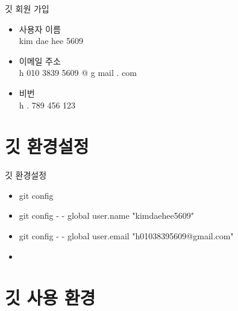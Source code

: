 \documentclass[aspectratio=1610,20pt,xcolor=pdftex,dvipsnames,table,handout]{beamer}
\begin{document}
		\begin{frame} [t,plain]

			\begin{block} {깃  회원 가입}
			\setlength{\leftmargini}{2em}			
			\begin{itemize}
				\item 사용자 이름 \\ kim dae hee 5609
				\item 이메일 주소 \\ h 010 3839 5609 @ g mail . com
				\item 비번 \\  h . 789 456 123
			\end{itemize}
			\end{block}						

		\end{frame}			


		\section{깃 환경설정}


		\begin{frame} [t,plain]

			\begin{block} {깃 환경설정}
			\setlength{\leftmargini}{2em}			
			\begin{itemize}
				\item git config
				\item git config - - global user.name "kimdaehee5609"
				\item git config - - global user.email "h01038395609@gmail.com"
				\item 
			\end{itemize}
			\end{block}						


		\end{frame}			


		\section{깃 사용 환경}
\end{document}
